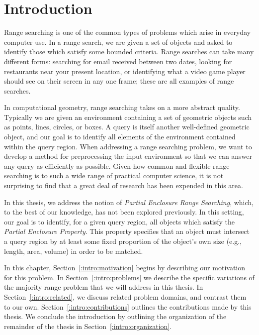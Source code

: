 \chapter{Introduction}
\label{:intro}

Range searching is one of the common types of problems which arise in everyday computer use. 
In a range search, we are given a set of objects and asked to identify those which satisfy some bounded criteria. 
Range searches can take many different forms: searching for email received between two dates, looking for restaurants near your present location, or identifying what a video game player should see on their screen in any one frame; these are all examples of range searches.

In computational geometry, range searching takes on a more abstract quality. 
Typically we are given an environment containing a set of geometric objects such as points, lines, circles, or boxes. 
A query is itself another well-defined geometric object, and our goal is to identify all elements of the environment contained within the query region.  
When addressing a range searching problem, we want to develop a method for preprocessing the input environment so that we can answer any query as efficiently as possible.
Given how common and flexible range searching is to such a wide range of practical computer science, it is not surprising to  find that a great deal of research has been expended in this area.  

In this thesis, we address the notion of \emph{Partial Enclosure Range Searching}, which, to the best of our knowledge, has not been explored previously. 
In this setting, our goal is to identify, for a given query region, all objects which satisfy the \emph{Partial Enclosure Property}. 
This property specifies that an object must intersect a query region by at least some fixed proportion of the object's own size (e.g., length, area, volume) in order to be matched.

In this chapter, Section~\ref{:intro:motivation} begins by describing our motivation for this problem. 
In Section~\ref{:intro:problems} we describe the specific variations of the majority range problem that we will address in this thesis. 
In Section~\ref{:intro:related}, we discuss related problem domains, and contrast them to our own.
Section~\ref{:intro:contributions} outlines the contributions made by this thesis.
We conclude the introduction by outlining the organization of the remainder of the thesis in Section~\ref{:intro:organization}.


